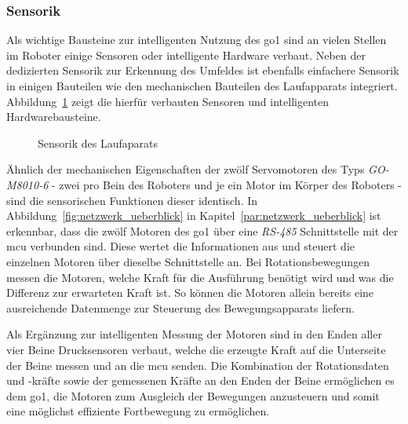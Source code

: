 \subsubsection{Sensorik}
\label{subsubsec:sensorik}

Als wichtige Bausteine zur intelligenten Nutzung des \gls{go1} sind an vielen Stellen im Roboter
einige Sensoren oder intelligente Hardware verbaut.
Neben der dedizierten Sensorik zur Erkennung des Umfeldes ist ebenfalls einfachere Sensorik
in einigen Bauteilen wie den mechanischen Bauteilen des Laufapparats integriert.
Abbildung~\ref{fig:laufapparat} zeigt die hierfür verbauten Sensoren und intelligenten Hardwarebausteine.

\begin{figure}[h]
    \caption{Sensorik des Laufaparats}\label{fig:laufapparat}
\end{figure}

Ähnlich der mechanischen Eigenschaften der zwölf Servomotoren des Typs \emph{GO-M8010-6} - zwei pro Bein des Roboters 
und je ein Motor im Körper des Roboters  - sind die sensorischen Funktionen dieser identisch.
In Abbildung~\ref{fig:netzwerk_ueberblick} in Kapitel~\ref{par:netzwerk_ueberblick} ist erkennbar, dass die
zwölf Motoren des \gls{go1} über eine \emph{RS-485} Schnittstelle mit der \gls{mcu} verbunden sind.
Diese wertet die Informationen aus und steuert die einzelnen Motoren über dieselbe Schnittstelle an.
Bei Rotationsbewegungen messen die Motoren, welche Kraft für die Ausführung benötigt wird und was die Differenz zur
erwarteten Kraft ist.
So können die Motoren allein bereits eine ausreichende Datenmenge zur Steuerung des Bewegungsapparats liefern.

Als Ergänzung zur intelligenten Messung der Motoren sind in den Enden aller vier Beine  Drucksensoren verbaut, welche
die erzeugte Kraft auf die Unterseite der Beine messen und an die \gls{mcu} senden.
Die Kombination der Rotationsdaten und -kräfte sowie der gemessenen Kräfte an den Enden der Beine ermöglichen es dem
\gls{go1}, die Motoren zum Ausgleich der Bewegungen anzusteuern und somit eine möglichst effiziente Fortbewegung zu
ermöglichen.

